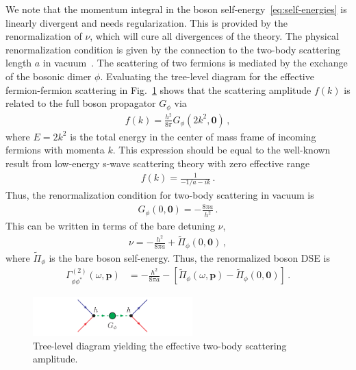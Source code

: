 We note that the momentum integral in the boson self-energy~\eqref{eq:self-energies} is linearly divergent and needs regularization. This is provided by the renormalization of $\nu$, which will cure all divergences of the theory. The physical renormalization condition is given by the connection to the two-body scattering length $a$ in vacuum~\cite{Schmidt2011,Frank2018-1}. The scattering of two fermions is mediated by the exchange of the bosonic dimer $\phi$. Evaluating the tree-level diagram for the effective fermion-fermion scattering in Fig.~\ref{fig:two-body-scattering} shows that the scattering amplitude $f(k)$ is related to the full boson propagator $G_{\phi}$ via~\cite{Schmidt2011,Zwerger2016}
%
\begin{align}
	\label{eq:scattering-amplitude-propagator}
	f(k) = \frac{h^2}{8\pi} G_{\phi}(2k^2,\bm{0}) \,,
\end{align}
%
where $E=2k^2$ is the total energy in the center of mass frame of incoming fermions with momenta $k$. This expression should be equal to the well-known result from low-energy s-wave scattering theory with zero effective range~\cite{Frank2018-1,Schmidt2013}
%
\begin{align}
	f(k) = \frac{1}{-1/a-ik} \,.
\end{align}
%
Thus, the renormalization condition for two-body scattering in vacuum is
%
\begin{align}
	G_{\phi}(0,\bm{0}) = -\frac{8\pi a}{h^2} \,.
\end{align}
%
This can be written in terms of the bare detuning $\nu$,
%
\begin{align}
	\nu = -\frac{h^2}{8\pi a} + \tilde{\Pi}_{\phi}(0,\bm{0}) \,,
\end{align}
%
where $\tilde{\Pi}_{\phi}$ is the bare boson self-energy. Thus, the renormalized boson DSE is
%
\begin{align}
	\Gamma^{(2)}_{\phi\phi^*}(\omega,\bm{p}) &= -\frac{h^2}{8\pi a} - \left[ \tilde{\Pi}_{\phi}(\omega,\bm{p}) - \tilde{\Pi}_{\phi}(0,\bm{0}) \right] \,.
\end{align}
%

\begin{figure}[h]
	\centering
	\includegraphics[width=0.55\textwidth]{figs/two-body.pdf}
	\caption[Two-body scattering]{Tree-level diagram yielding the effective two-body scattering amplitude.}
	\label{fig:two-body-scattering}
\end{figure}

